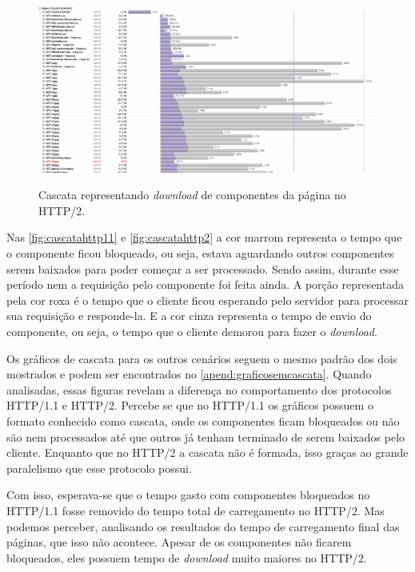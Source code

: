 \begin{figure}[!htbp]
    \centering
    \caption{Cascata representando \textit{download} de componentes da página no HTTP/2.}
    \includegraphics[width=1.0\textwidth]{./04-figuras/analise-de-resultados/cascata_http2}
    \label{fig:cascatahttp2}
\end{figure}

Nas \autoref{fig:cascatahttp11} e \autoref{fig:cascatahttp2} a cor marrom representa o tempo que o componente ficou bloqueado, ou seja, estava aguardando outros componentes serem baixados para poder começar a ser processado. Sendo assim, durante esse período nem a requisição pelo componente foi feita ainda. A porção representada pela cor roxa é o tempo que o cliente ficou esperando pelo servidor para processar sua requisição e responde-la. E a cor cinza representa o tempo de envio do componente, ou seja, o tempo que o cliente demorou para fazer o \textit{download}.

Os gráficos de cascata para os outros cenários seguem o mesmo padrão dos dois mostrados e podem ser encontrados no \autoref{apend:graficosemcascata}. Quando analisadas, essas figuras revelam a diferença no comportamento dos protocolos HTTP/1.1 e HTTP/2. Percebe se que no HTTP/1.1 os gráficos possuem o formato conhecido como cascata, onde os componentes ficam bloqueados ou não são nem processados até que outros já tenham terminado de serem baixados pelo cliente. Enquanto que no HTTP/2 a cascata não é formada, isso graças ao grande paralelismo que esse protocolo possui.

Com isso, esperava-se que o tempo gasto com componentes bloqueados no HTTP/1.1 fosse removido do tempo total de carregamento no HTTP/2. Mas podemos perceber, analisando os resultados do tempo de carregamento final das páginas, que isso não acontece. Apesar de os componentes não ficarem bloqueados, eles possuem tempo de \textit{download} muito maiores no HTTP/2.

